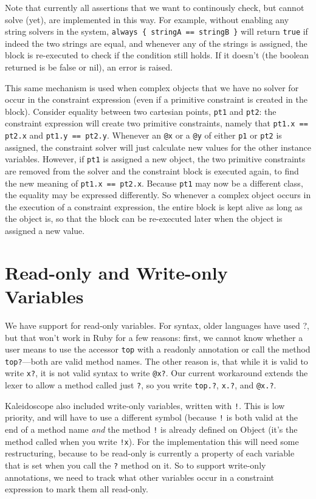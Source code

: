 \documentclass[11pt]{article}
\begin{document}
Note that currently all assertions that we want to continously check,
but cannot solve (yet), are implemented in this way. For example, without
enabling any string solvers in the system, 
\lstinline!always { stringA == stringB }! will return \lstinline{true} 
if indeed the two strings
are equal, and whenever any of the strings is assigned, the block is
re-executed to check if the condition still holds. If it doesn't (the
boolean returned is be false or nil), an error is raised.

This same mechanism is used when complex objects that we have no
solver for occur in the constraint expression (even if a primitive
constraint is created in the block). Consider equality between two
cartesian points, \lstinline{pt1} and \lstinline{pt2}: the constraint
expression will create two primitive constraints, namely that
\lstinline{pt1.x == pt2.x} and \lstinline{pt1.y == pt2.y}. Whenever an
\lstinline{@x} or a \lstinline{@y} of either \lstinline{p1} or
\lstinline{pt2} is assigned, the constraint solver will just calculate
new values for the other instance variables. However, if
\lstinline{pt1} is assigned a new object, the two primitive
constraints are removed from the solver and the constraint block is
executed again, to find the new meaning of \lstinline{pt1.x == pt2.x}.
Because \lstinline{pt1} may now be a different class, the equality may
be expressed differently. So whenever a complex object occurs in the
execution of a constraint expression, the entire block is kept alive
as long as the object is, so that the block can be re-executed later
when the object is assigned a new value.


\section{Read-only and Write-only Variables}

We have support for read-only variables.  For syntax, older languages
have used ?, but that won't work in Ruby for a few reasons: first, we
cannot know whether a user means to use the accessor \lstinline{top}
with a readonly annotation or call the method \lstinline{top?}---both
are valid method names. The other reason is, that while it is valid to
write \lstinline{x?}, it is not valid syntax to write
\lstinline{@x?}. Our current workaround extends the lexer to allow a
method called just \lstinline{?}, so you write \lstinline{top.?},
\lstinline{x.?}, and \lstinline{@x.?}.

Kaleidoscope also included write-only variables, written with
\lstinline{!}. This is low priority, and will have to use a different
symbol (because \lstinline{!} is both valid at the end of a method
name \emph{and} the method \lstinline{!} is already defined on Object
(it's the method called when you write \lstinline{!x}). For the
implementation this will need some restructuring, because to be
read-only is currently a property of each variable that is set when
you call the \lstinline{?} method on it. So to support write-only
annotations, we need to track what other variables occur in a
constraint expression to mark them all read-only.
\end{document}
